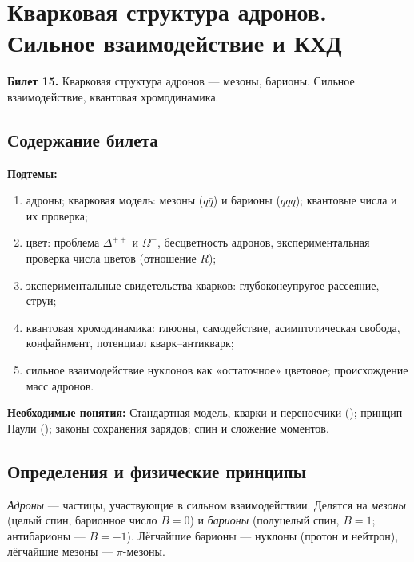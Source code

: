 \chapter[Кварковая структура адронов. Квантовая хромодинамика]%
        {Кварковая структура адронов. Сильное взаимодействие и КХД}
\label{t:15}

\begin{qbox}
\textbf{Билет 15.} Кварковая структура адронов — мезоны, барионы. Сильное взаимодействие,
квантовая хромодинамика.
\end{qbox}

\section{Содержание билета}

\textbf{Подтемы:}
\begin{enumerate}
 \item адроны; кварковая модель: мезоны ($q\bar q$) и барионы ($qqq$); квантовые числа и их проверка;
 \item цвет: проблема $\Delta^{++}$ и $\Omega^-$, бесцветность адронов, экспериментальная проверка числа цветов (отношение $R$);
 \item экспериментальные свидетельства кварков: глубоконеупругое рассеяние, струи;
 \item квантовая хромодинамика: глюоны, самодействие, асимптотическая свобода, конфайнмент, потенциал кварк--антикварк;
 \item сильное взаимодействие нуклонов как «остаточное» цветовое; происхождение масс адронов.
\end{enumerate}

\textbf{Необходимые понятия:} Стандартная модель, кварки и переносчики (); принцип Паули
(); законы сохранения зарядов; спин и сложение моментов.

\section{Определения и физические принципы}

\begin{definition}[адроны]
\emph{Адроны} — частицы, участвующие в сильном взаимодействии. Делятся на \emph{мезоны} (целый спин,
барионное число $B=0$) и \emph{барионы} (полуцелый спин, $B=1$; антибарионы — $B=-1$). Лёгчайшие барионы —
нуклоны (протон и нейтрон), лёгчайшие мезоны — $\pi$-мезоны.
\end{definition}

